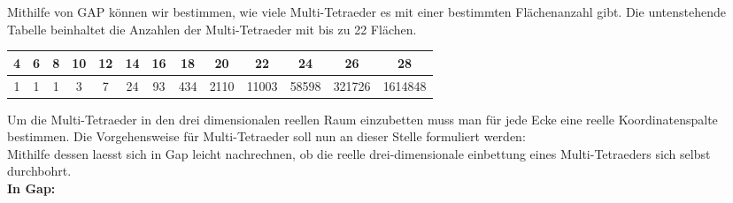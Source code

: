 \documentclass[12pt,titlepage,twoside,cleardoublepage]{article}
\theoremstyle{nummermitklammern}
\numberwithin{equation}{section}
\begin{document}
Mithilfe von GAP können wir bestimmen, wie viele Multi-Tetraeder es mit einer bestimmten Flächenanzahl gibt.
Die untenstehende Tabelle beinhaltet die Anzahlen der Multi-Tetraeder mit bis zu 22 Flächen.
\begin{center}
\begin{tabular}[h]{|c|c|c|c|c|c|c|c|c|c|c|c|c|}
\hline
\textbf{ 4} &  \textbf{6}& \textbf{8} &\textbf{ 10} &\textbf{ 12} & \textbf{14}&\textbf{16}&\textbf{18}&\textbf{20}&\textbf{22}&\textbf{24}&\textbf{26}&\textbf{28}\\
\hline
 1& 1& 1& 3& 7& 24& 93& 434& 2110& 11003& 58598& 321726& 1614848
 \\
 \hline
\end{tabular}
\end{center}
Um die Multi-Tetraeder in den drei dimensionalen reellen Raum einzubetten muss man für jede Ecke eine reelle Koordinatenspalte bestimmen. Die Vorgehensweise für Multi-Tetraeder soll nun an dieser Stelle formuliert werden:\\
Mithilfe dessen laesst sich in Gap leicht nachrechnen, ob die reelle drei-dimensionale einbettung eines Multi-Tetraeders sich selbst durchbohrt.\\
\textbf{In Gap:}
\end{document}
